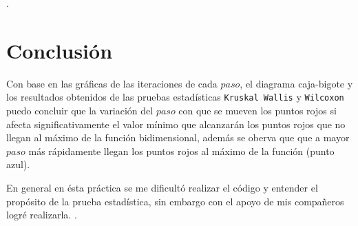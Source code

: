 \documentclass{article}
\begin{document}
\newpage
.
\bigskip

\section{Conclusi\'{o}n}
Con base en las gráficas de las iteraciones de cada $paso$, el diagrama caja-bigote y los resultados obtenidos de las pruebas estadísticas \texttt{Kruskal Wallis} y \texttt{Wilcoxon} puedo concluir que la variación del $paso$ con que se mueven los puntos rojos si afecta significativamente el valor mínimo que alcanzarán los puntos rojos que no llegan al máximo de la función bidimensional, además se oberva que que a mayor $paso$ más rápidamente llegan los puntos rojos al máximo de la función (punto azul). 
\smallskip

En general en ésta práctica se me dificultó realizar el código y entender el propósito de la prueba estadística, sin embargo con el apoyo de mis compañeros logré realizarla. 
\newpage
.
\bigskip



\end{document}
